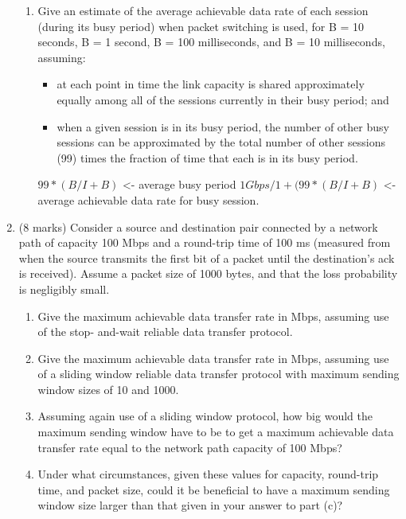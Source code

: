 \documentclass[10pt]{amsart}
\begin{document}
\begin{enumerate}
\begin{enumerate}
        \item Give an estimate of the average achievable data rate of each
            session (during its busy period) when packet switching is used, for
            B = 10 seconds, B = 1 second, B = 100 milliseconds, and B = 10
            milliseconds, assuming:
        \begin{itemize}
            \item at each point in time the link capacity is shared approximately
                equally among all of the sessions currently in their busy period; and
            \item when a given session is in its busy period, the number of other busy
                sessions can be approximated by the total number of other sessions (99)
                times the fraction of time that each is in its busy period.
        \end{itemize}
            $99 * ( B / I + B )$ <- average busy period 
            $1Gbps / 1 + (99 * ( B / I + B )$ <- average achievable data rate
            for busy session.
    \end{enumerate}
    \item (8 marks) Consider a source and destination pair connected by a network
        path of capacity 100 Mbps and a round-trip time of 100 ms (measured from
        when the source transmits the first bit of a packet until the destination’s
        ack is received). Assume a packet size of 1000 bytes, and that the loss
        probability is negligibly small.
    \begin{enumerate}
        \item Give the maximum achievable data transfer rate in Mbps, assuming
            use of the stop- and-wait reliable data transfer protocol.
        \item Give the maximum achievable data transfer rate in Mbps, assuming
            use of a sliding window reliable data transfer protocol with maximum
            sending window sizes of 10 and 1000.
        \item Assuming again use of a sliding window protocol, how big would the
            maximum sending window have to be to get a maximum achievable data
            transfer rate equal to the network path capacity of 100 Mbps?
        \item Under what circumstances, given these values for capacity,
            round-trip time, and packet size, could it be beneficial to have a
            maximum sending window size larger than that given in your answer to
            part (c)?
    \end{enumerate}
\end{enumerate}
\end{document}
